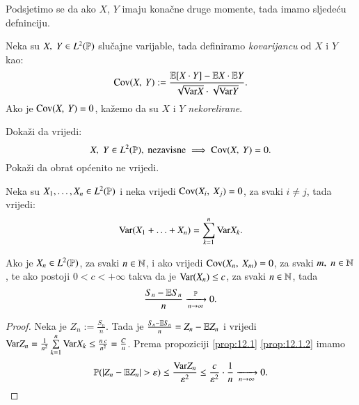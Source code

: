 Podsjetimo se da ako $X$, $Y$ imaju kona\v cne druge momente, tada imamo sljede\' cu defninciju.

\begin{defn}    \label{defn:12.1-1}
    Neka su $X, \; Y \in L^2(\mathbb{P})$ slu\v cajne varijable, tada definiramo \emph{kovarijancu} od $X$ i $Y$ kao:
    \begin{equation}    \label{jed:12.2}
        \mathrm{Cov} ({X}, \: {Y}) := \frac{\mathbb{E} [X \cdot Y] - \mathbb{E} X \cdot \mathbb{E} Y}{\sqrt{\mathrm{Var} X} \cdot \sqrt{\mathrm{Var} Y}}.
    \end{equation}
    Ako je $\mathrm{Cov} ({X}, \: {Y}) = 0$, ka\v zemo da su $X$ i $Y$ \emph{nekorelirane}.
\end{defn}

\begin{zad} \label{zad:12.3}
    Doka\v zi da vrijedi:
    \begin{equation*}
        X, \; Y \in L^2(\mathbb{P}), \textnormal{ nezavisne} \implies \mathrm{Cov} ({X}, \: {Y}) = 0.
    \end{equation*}
    Poka\v zi da obrat op\' cenito ne vrijedi.
\end{zad}

\begin{zad} \label{zad:12.4}
    Neka su $X_1, \ldots, X_n \in L^2(\mathbb{P})$ i neka vrijedi $\mathrm{Cov} ({X_i}, \: {X_j}) = 0$, za svaki $i \neq j$, tada vrijedi:
    \begin{equation*}
        \mathrm{Var} (X_1 + \ldots + X_n) = \sum\limits_{k = 1}^{n} \mathrm{Var} X_k.
    \end{equation*}
\end{zad}

\begin{tm}  \label{tm:12.5}
    Ako je $X_n \in L^2 (\mathbb{P})$, za svaki $n \in \mathbb{N}$, i ako vrijedi $\mathrm{Cov} ({X_n}, \: {X_m}) = 0$, za svaki $m, \; n \in \mathbb{N}$, te ako postoji $0 < c < + \infty$ takva da je $\mathrm{Var} (X_n) \leq c$, za svaki $n \in \mathbb{N}$, tada
    \begin{equation*}
        \frac{S_n - \mathbb{E} S_n}{n} \xrightarrow[n \to \infty]{\mathbb{P}} 0.
    \end{equation*}
\end{tm}

\begin{proof}
    Neka je $Z_n := \frac{S_n}{n}$.
    Tada je $\frac{S_n - \mathbb{E} S_n}{n} = Z_n - \mathbb{E} Z_n$ i vrijedi $\mathrm{Var} Z_n = \frac{1}{n^2} \sum\limits_{k = 1}^{n} \mathrm{Var} X_k \leq \frac{n \: c}{n^2} = \frac{C}{n}$.
    Prema propoziciji \ref{prop:12.1} \ref{prop:12.1.2} imamo
    \begin{equation*}
        \mathbb{P}({|Z_n - \mathbb{E} Z_n| > \varepsilon}) \leq \frac{\mathrm{Var} Z_n}{\varepsilon^2} \leq \frac{c}{\varepsilon^2} \cdot \frac{1}{n} \xrightarrow[n \to \infty]{} 0.
    \end{equation*}
\end{proof}

